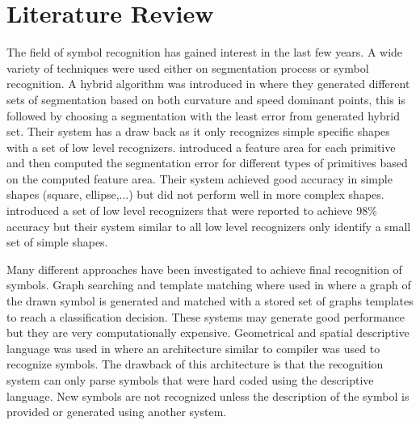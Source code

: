 \documentclass[a4paper,10pt]{IEEEconf}
\begin{document}
\section{Literature Review}
\label{Sec:RelatedWork}
The field of symbol recognition has gained interest in the last few years. A wide variety of techniques were used either on segmentation process or symbol recognition.
A hybrid algorithm was introduced in \cite{earlyprocess} where they generated different sets of segmentation based on both curvature and speed dominant points, this is followed by choosing a segmentation with the least error from generated hybrid set. Their system has a draw back as it only recognizes simple specific shapes with a set of low level recognizers. \cite{meanshift10} introduced a feature area for each primitive and then computed the segmentation error for different types of primitives based on the computed feature area. Their system achieved good accuracy in simple shapes (square, ellipse,...) but did not perform well in more complex shapes\cite{meanshift10,Paleosketch08}. \citeauthor{Paleosketch08} \cite{Paleosketch08} introduced a set of low level recognizers that were reported to achieve 98\%  accuracy but their system similar to all low level recognizers only identify a small set of simple shapes. 

Many different approaches have been investigated to achieve final recognition of symbols. Graph searching and template matching where used in \cite{GraphBased07} where a graph of the drawn symbol is generated and matched with a stored set of graphs templates to reach a classification decision. These systems may generate good performance but they are very computationally expensive. Geometrical and spatial descriptive language was used in \cite{SketchRead2007,Ladder30} where an architecture similar to compiler was used to recognize symbols. The drawback of this architecture is that the recognition system can only parse symbols that were hard coded using the descriptive language. New symbols are not recognized unless the description of the symbol is provided or generated using another system.  %
\end{document}
